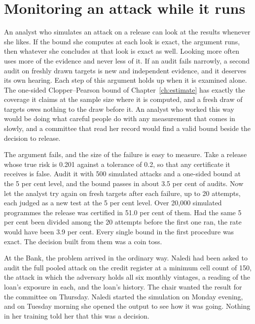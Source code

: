 \chapter{Monitoring an attack while it runs}\label{ch:monitoring}

An analyst who simulates an attack on a release can look at the results whenever
she likes. If the bound she computes at each look is exact, the argument runs, then
whatever she concludes at that look is exact as well. Looking more often uses more
of the evidence and never less of it. If an audit fails narrowly, a second audit on
freshly drawn targets is new and independent evidence, and it deserves its own
hearing. Each step of this argument holds up when it is examined alone. The
one-sided Clopper--Pearson bound of Chapter~\ref{ch:estimate} has exactly the
coverage it claims at the sample size where it is computed, and a fresh draw of
targets owes nothing to the draw before it. An analyst who worked this way would
be doing what careful people do with any measurement that comes in slowly, and a
committee that read her record would find a valid bound beside the decision to
release.

The argument fails, and the size of the failure is easy to measure. Take a release
whose true risk is 0.201 against a tolerance of 0.2, so that any certificate it
receives is false. %
Audit it with 500 simulated attacks and a one-sided bound at the 5 per cent level,
and the bound passes in about 3.5 per cent of audits.
Now let the analyst try again on fresh targets after each failure, up to 20
attempts, each judged as a new test at the 5 per cent level. Over 20,000 simulated
programmes the release was certified in 51.0 per cent of them. Had the same 5 per
cent been divided among the 20 attempts before the first one ran, the rate would
have been 3.9 per cent.
Every single bound in the first procedure was exact. The decision built from them
was a coin toss.

At the Bank, the problem arrived in the ordinary way. Naledi had been asked to
audit the full pooled attack on the credit register at a minimum cell count of 150,
the attack in which the adversary holds all six monthly vintages, a reading of the
loan's exposure in each, and the loan's history. The chair wanted the result for
the committee on Thursday. Naledi started the simulation on Monday evening, and on
Tuesday morning she opened the output to see how it was going. Nothing in her
training told her that this was a decision.

